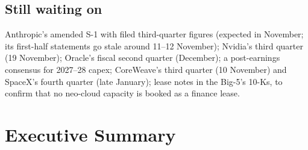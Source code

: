 \documentclass[11pt,letterpaper]{article}
\begin{document}
\subsection*{Still waiting on}\label{ag:waiting}
Anthropic's amended S-1 with filed third-quarter figures (expected in November; its first-half statements go stale around 11--12 November); Nvidia's third quarter (19 November); Oracle's fiscal second quarter (December); a post-earnings consensus for 2027--28 capex; CoreWeave's third quarter (10 November) and SpaceX's fourth quarter (late January); lease notes in the Big-5's 10-Ks, to confirm that no neo-cloud capacity is booked as a finance lease.
\newpage

\section*{Executive Summary}\label{ag:exec}
\end{document}
